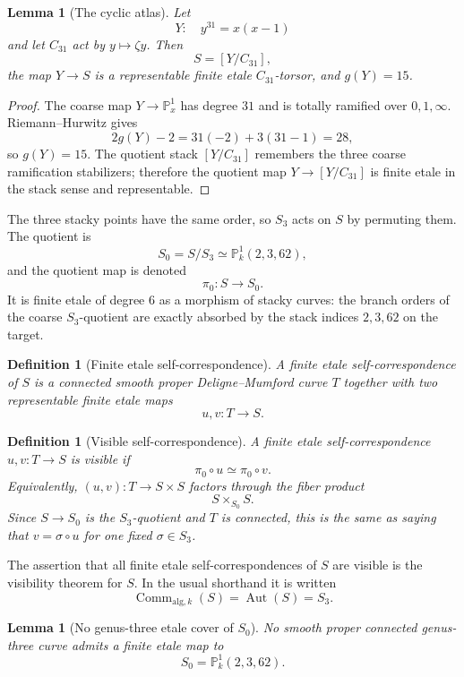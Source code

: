 \documentclass[11pt]{amsart}
\newtheorem{lemma}[theorem]{Lemma}
\newtheorem{definition}[theorem]{Definition}
\newcommand{\PP}{\mathbb P}
\newcommand{\Aut}{\operatorname{Aut}}
\newcommand{\Comm}{\operatorname{Comm}}
\begin{document}
\begin{lemma}[The cyclic atlas]
\label{lem:atlas}
Let
\[
  Y:\quad y^{31}=x(x-1)
\]
and let \(C_{31}\) act by \(y\mapsto \zeta y\).  Then
\[
  S=[Y/C_{31}],
\]
the map \(Y\to S\) is a representable finite etale \(C_{31}\)-torsor, and
\(g(Y)=15\).
\end{lemma}

\begin{proof}
The coarse map \(Y\to\PP^1_x\) has degree \(31\) and is totally ramified over
\(0,1,\infty\).  Riemann--Hurwitz gives
\[
  2g(Y)-2=31(-2)+3(31-1)=28,
\]
so \(g(Y)=15\).  The quotient stack \([Y/C_{31}]\) remembers the three coarse
ramification stabilizers; therefore the quotient map \(Y\to [Y/C_{31}]\) is
finite etale in the stack sense and representable.
\end{proof}

The three stacky points have the same order, so \(S_3\) acts on \(S\) by
permuting them.  The quotient is
\[
  S_0=S/S_3\simeq \PP^1_k(2,3,62),
\]
and the quotient map is denoted
\[
  \pi_0:S\longrightarrow S_0.
\]
It is finite etale of degree \(6\) as a morphism of stacky curves: the branch
orders of the coarse \(S_3\)-quotient are exactly absorbed by the stack
indices \(2,3,62\) on the target.

\begin{definition}[Finite etale self-correspondence]
A finite etale self-correspondence of \(S\) is a connected smooth proper
Deligne--Mumford curve \(T\) together with two representable finite etale maps
\[
  u,v:T\to S.
\]
\end{definition}

\begin{definition}[Visible self-correspondence]
\label{def:visible}
A finite etale self-correspondence \(u,v:T\to S\) is visible if
\[
  \pi_0\circ u\simeq \pi_0\circ v.
\]
Equivalently, \((u,v):T\to S\times S\) factors through the fiber product
\[
  S\times_{S_0}S.
\]
Since \(S\to S_0\) is the \(S_3\)-quotient and \(T\) is connected, this is the
same as saying that \(v=\sigma\circ u\) for one fixed \(\sigma\in S_3\).
\end{definition}

The assertion that all finite etale self-correspondences of \(S\) are visible
is the visibility theorem for \(S\).  In the usual shorthand it is written
\[
  \Comm_{\mathrm{alg},k}(S)=\Aut(S)=S_3.
\]

\begin{lemma}[No genus-three etale cover of \(S_0\)]
\label{lem:no-genus3-S0}
No smooth proper connected genus-three curve admits a finite etale map to
\[
  S_0=\PP^1_k(2,3,62).
\]
\end{lemma}
\end{document}
